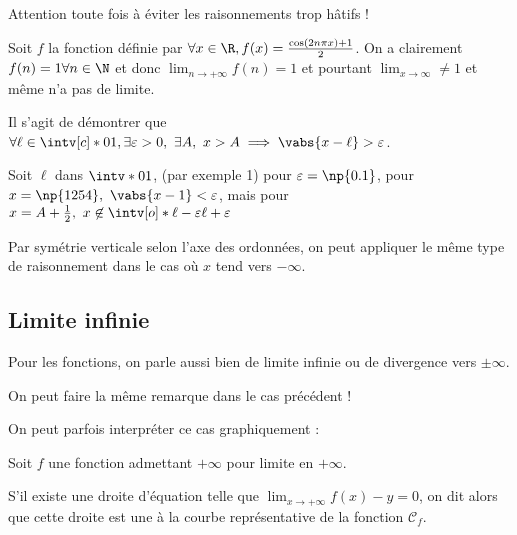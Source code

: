 \documentclass[12pt,a4paper,frenchb]{article}
\begin{document}
Attention toute fois à éviter les raisonnements trop hâtifs !
\begin{exemple}
  Soit $f$ la fonction définie par $\forall x\in\R, f(x) = \frac{\cos(2n\pi x)
  +1 }{2}$. On a clairement $f(n) = 1 \forall n \in\N$ et donc
  $\lim_{n\to+\infty}f(n) = 1$ et pourtant $\lim_{x\to\infty} \neq 1$ et
  même n'a pas de limite.
  \begin{preuve}
    Il s'agit de démontrer que $\forall \ell \in \intv[c]*{0}{1},\exists
    \varepsilon > 0,\ \exists A,\ x > A \implies \vabs{x - \ell} >
    \varepsilon$.

    Soit $\ell$ dans $\intv*{0}{1}$, (par exemple 1) pour $\varepsilon =
    \np{0.1}$, pour $x = \np{1254},\ \vabs{x - 1} < \varepsilon$, mais
    pour $x = A + \frac12,\ x\not\in \intv[o]*{\ell - \varepsilon}{\ell +
    \varepsilon}$
  \end{preuve}
\end{exemple}

Par symétrie verticale selon l'axe des ordonnées, on peut appliquer le
même type de raisonnement dans le cas où $x$ tend vers $-\infty$.


\subsection{Limite infinie}

Pour les fonctions, on parle aussi bien de limite infinie ou de
divergence vers $\pm\infty$.


On peut faire la même remarque dans le cas précédent !

On peut parfois interpréter ce cas graphiquement :

\begin{minipage}{0.99\linewidth}
  Soit $f$ une fonction admettant $+\infty$ pour limite en $+\infty$.

  S'il existe une droite d'équation \hspace{2cm} telle que
  $\lim_{x\to+\infty}f(x) - y = 0$, on dit alors que cette droite est
  une \vspace{9mm}\hspace{6cm} à la courbe représentative de la fonction
  $\mathscr{C}_f$.
\end{minipage}
\end{document}
